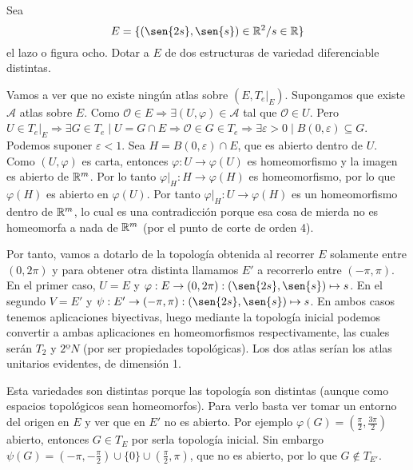 \documentclass[twoside]{article}
\begin{document}
\newpage

\begin{ejercicio}{3}
Sea
$$E = \{ (\sen{2s}, \sen{s})\in \R^2 / s\in \R\}$$ 
el lazo o figura ocho. Dotar a $E$ de dos estructuras de variedad diferenciable
distintas.
\end{ejercicio}
\begin{solucion}
Vamos a ver que no existe ningún atlas sobre $(E,T_e|_E)$. Supongamos que existe $\mathcal{A}$ atlas sobre $E$. Como $\mathcal{O}\in E\Rightarrow \exists(U,\varphi)\in\mathcal{A}$ tal que $\mathcal{O}\in U$. Pero $U\in T_e|_E\Rightarrow \exists G\in T_e\mid U=G\cap E\Rightarrow \mathcal{O}\in G\in T_e\Rightarrow \exists\varepsilon>0\mid B(0,\varepsilon)\subseteq G$. Podemos suponer $\varepsilon<1$. Sea $H=B(0,\varepsilon)\cap E$, que es abierto dentro de $U$. Como $(U,\varphi)$ es carta, entonces $\varphi:U\to\varphi(U)$ es homeomorfismo y la imagen es abierto de $\mathbb{R}^m$. Por lo tanto $\varphi|_H: H\to\varphi(H)$ es homeomorfismo, por lo que $\varphi(H)$ es abierto en $\varphi(U)$. Por tanto $\varphi|_H:U\to\varphi(H)$ es un homeomorfismo dentro de $\mathbb{R}^m$, lo cual es una contradicción porque esa cosa de mierda no es homeomorfa a nada de $\mathbb{R}^m$ (por el punto de corte de orden 4).

Por tanto, vamos a dotarlo de la topología obtenida al recorrer $E$ solamente entre $(0,2\pi)$ y para obtener otra distinta llamamos $E'$ a recorrerlo entre $(-\pi,\pi)$. En el primer caso, $U=E$ y $\varphi:E\to (0,2\pi): (\sen{2s},\sen{s})\mapsto s$. En el segundo $V=E'$ y $\psi:E'\to(-\pi,\pi):(\sen{2s},\sen{s})\mapsto s$. En ambos casos tenemos aplicaciones biyectivas, luego mediante la topología inicial podemos convertir a ambas aplicaciones en homeomorfismos respectivamente, las cuales serán $T_2$ y $2ºN$ (por ser propiedades topológicas). Los dos atlas serían los atlas unitarios evidentes, de dimensión 1. 

Esta variedades son distintas porque las topología son distintas (aunque como espacios topológicos sean homeomorfos). Para verlo basta ver tomar un entorno del origen en $E$ y ver que en $E'$ no es abierto. Por ejemplo $\varphi(G)=(\frac{\pi}{2},\frac{3\pi}{2})$ abierto, entonces $G\in T_E$ por serla topología inicial. Sin embargo $\psi(G)=(-\pi,-\frac{\pi}{2})\cup\{0\}\cup(\frac{\pi}{2},\pi)$, que no es abierto, por lo que $G\notin T_{E'}$. 
\end{solucion}

\newpage
\end{document}
